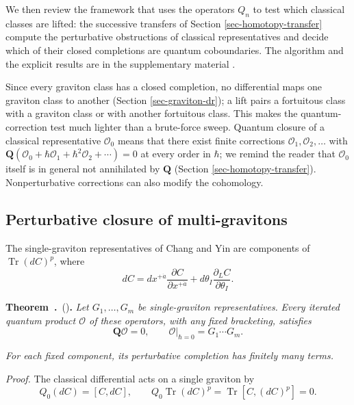 \documentclass[11pt]{article}
\numberwithin{equation}{section}
\numberwithin{figure}{section}
\numberwithin{table}{section}
\newcounter{rthmc}[section]
\renewcommand{\therthmc}{\thesection.\arabic{rthmc}}
\newcommand{\rthm}[3]{\par\addvspace{\medskipamount}\noindent\refstepcounter{rthmc}\label{#2}\textbf{#1~\therthmc}\if\relax\detokenize{#3}\relax\else\ (#3)\fi\textbf{.}}
\begin{document}
We then review the framework that uses the operators $Q_n$ to test which classical classes are lifted: the successive transfers of Section \ref{sec-homotopy-transfer} compute the perturbative obstructions of classical representatives and decide which of their closed completions are quantum coboundaries. The algorithm and the explicit results are in the supplementary material \cite{Repo}.

Since every graviton class has a closed completion, no differential maps one graviton class to another (Section \ref{sec-graviton-dr}); a lift pairs a fortuitous class with a graviton class or with another fortuitous class. This makes the quantum-correction test much lighter than a brute-force sweep. Quantum closure of a classical representative $\mathcal O_0$ means that there exist finite corrections $\mathcal O_1,\mathcal O_2,\ldots$ with $\mathbf Q(\mathcal O_0+\hbar\mathcal O_1+\hbar^2\mathcal O_2+\cdots)=0$ at every order in $\hbar$; we remind the reader that $\mathcal O_0$ itself is in general not annihilated by $\mathbf Q$ (Section \ref{sec-homotopy-transfer}). Nonperturbative corrections can also modify the cohomology.

\subsection{Perturbative closure of multi-gravitons}\label{sec-graviton-closure}

The single-graviton representatives of Chang and Yin \cite[Section 4]{ChangYin} are components of $\operatorname{Tr}(dC)^p$, where
\begin{equation}\label{b-00629}
dC=dx^{+\dot a}\frac{\partial C}{\partial x^{+\dot a}}
+d\theta_I\frac{\partial_LC}{\partial\theta_I}.
\end{equation}

\rthm{Theorem}{b-00630}{} \emph{Let $G_1,\ldots,G_m$ be single-graviton representatives. } \emph{Every iterated quantum product $\mathcal O$ of these operators, with any fixed bracketing, satisfies}
\begin{equation}\label{eq-multigraviton-closure}
\mathbf Q\mathcal O=0,\qquad
\left.\mathcal O\right|_{\hbar=0}=G_1\cdots G_m.
\end{equation}

\emph{For each fixed component, its perturbative completion has finitely many terms.}

\emph{Proof.} The classical differential acts on a single graviton by
\begin{equation}\label{eq-2-58}
Q_0(dC)=[C,dC],\qquad Q_0\operatorname{Tr}(dC)^p=\operatorname{Tr}[C,(dC)^p]=0.
\end{equation}
\end{document}
